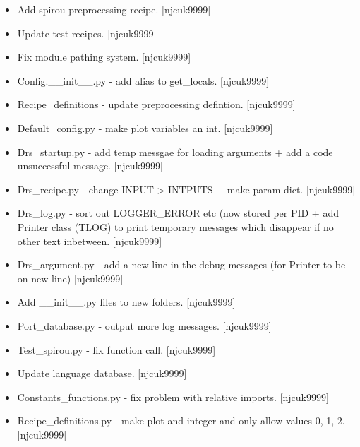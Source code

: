 \documentclass[a4paper,10pt,english]{report}
\begin{document}
\begin{itemize}
\item {} 
Add spirou preprocessing recipe. {[}njcuk9999{]}

\item {} 
Update test recipes. {[}njcuk9999{]}

\item {} 
Fix module pathing system. {[}njcuk9999{]}

\item {} 
Config.\_\_init\_\_.py - add alias to get\_locals. {[}njcuk9999{]}

\item {} 
Recipe\_definitions - update preprocessing defintion. {[}njcuk9999{]}

\item {} 
Default\_config.py - make plot variables an int. {[}njcuk9999{]}

\item {} 
Drs\_startup.py - add temp messgae for loading arguments + add a code
unsuccessful message. {[}njcuk9999{]}

\item {} 
Drs\_recipe.py - change INPUT \textendash{}\textgreater{} INTPUTS + make param dict.
{[}njcuk9999{]}

\item {} 
Drs\_log.py - sort out LOGGER\_ERROR etc (now stored per PID + add
Printer class (TLOG) to print temporary messages which disappear if no
other text inbetween. {[}njcuk9999{]}

\item {} 
Drs\_argument.py - add a new line in the debug messages (for Printer to
be on new line) {[}njcuk9999{]}

\item {} 
Add \_\_init\_\_.py files to new folders. {[}njcuk9999{]}

\item {} 
Port\_database.py - output more log messages. {[}njcuk9999{]}

\item {} 
Test\_spirou.py - fix function call. {[}njcuk9999{]}

\item {} 
Update language database. {[}njcuk9999{]}

\item {} 
Constants\_functions.py - fix problem with relative imports.
{[}njcuk9999{]}

\item {} 
Recipe\_definitions.py - make plot and integer and only allow values 0,
1, 2. {[}njcuk9999{]}


\end{itemize}
\end{document}
